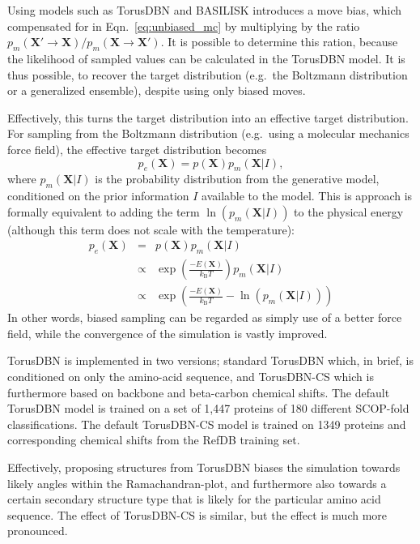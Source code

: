 Using models such as TorusDBN and BASILISK introduces a move bias, which compensated for in Eqn.~\ref{eq:unbiased_mc} by multiplying by the ratio $p_m(\mathbf{X'}     \rightarrow \mathbf{X}) / p_m(\mathbf{X} \rightarrow \mathbf{X'})$.
It is possible to determine this ration, because the likelihood of sampled values can be calculated in the TorusDBN model.
It is thus possible, to recover the target distribution (e.g.~the Boltzmann distribution or a generalized ensemble), despite using only biased moves.


Effectively, this turns the target distribution into an effective target distribution.
For sampling from the Boltzmann distribution (e.g.~using a molecular mechanics force field), the effective target distribution becomes
\begin{equation}
    p_e(\mathbf{X}) = p(\mathbf{X}) p_{m}(\mathbf{X}|I),
\end{equation}
where $p_{m}(\mathbf{X}|I)$ is the probability distribution from the generative model, conditioned on the prior information $I$ available to the model.
This is approach is formally equivalent to adding the term $\ln{(p_{m}(\mathbf{X}|I))}$ to the physical energy (although this term does not scale with the temperature):
\begin{eqnarray}
    p_e(\mathbf{X})
    &=& p(\mathbf{X}) p_{m}(\mathbf{X}|I) \nonumber\\
    &\propto& \exp{\left( \frac{-E(\mathbf{X})}{k_{\mathrm{B}}T} \right)}p_{m}(\mathbf{X}|I) \nonumber\\
    &\propto& \exp{\left( \frac{-E(\mathbf{X})}{k_{\mathrm{B}}T} - \ln{(p_{m}(\mathbf{X    }|I))}\right)}
\end{eqnarray}
In other words, biased sampling can be regarded as simply use of a better force field, while the convergence of the simulation is vastly improved.

TorusDBN is implemented in two versions;
standard TorusDBN which, in brief, is conditioned on only the amino-acid sequence, and TorusDBN-CS which is furthermore based on backbone and beta-carbon chemical shifts.
The default TorusDBN model is trained on a set of 1,447 proteins of 180 different SCOP-fold classifications. 
The default TorusDBN-CS model is trained on 1349 proteins and corresponding chemical shifts from the RefDB training set.

Effectively, proposing structures from TorusDBN biases the simulation towards likely angles within the Ramachandran-plot, and furthermore also towards a certain secondary structure type that is likely for the particular amino acid sequence.
The effect of TorusDBN-CS is similar, but the effect is much more pronounced.


